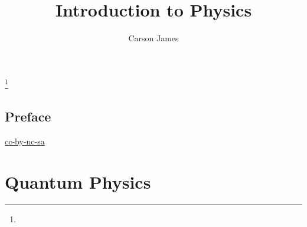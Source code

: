 \documentclass{book}
\begin{document}
	
	\frontmatter
	
	\title{Introduction to Physics}
	
	
	\author{Carson James}
	\thanks{}
	
	\date{}
	
	\maketitle
	
	
	\setcounter{page}{4}
	
	\tableofcontents
	\printunsrtglossary[type=symbols,style=long,title={Notation}]
	
	
	\mainmatter
	
	\chapter*{Preface}
	
	\begin{flushleft}
		\href{https://creativecommons.org/licenses/by-nc-sa/4.0/legalcode.txt}{cc-by-nc-sa}
	\end{flushleft}
	
	\newpage
	
	
	
	
	
	
	
	
	
	\newpage
	\part{Quantum Physics}
	
	\newpage
\end{document}
